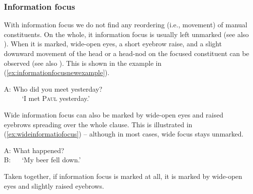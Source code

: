 \subsubsection{Information focus}
With information focus we do not find any reordering (i.e., movement) of manual constituents. On the whole, it information focus is usually left unmarked (see also \citealt{waleschkowski2009}). When it is marked, wide-open eyes, a short eyebrow raise, and a slight downward movement of the head or a head-nod on the focused constituent can be observed (see also \citealt[396]{happ2014vork}). This is shown in the example in (\ref{ex:informationfocusnewexample}).

\begin{exe}
\ex\label{ex:informationfocusnewexample}
A: Who did you meet yesterday?\\
\textcolor{white}{B: }  
\glt \textcolor{white}{B: }`I met \textsc{Paul} yesterday.'
\end{exe}

\noindent Wide information focus can also be marked by wide-open eyes and raised eyebrows spreading over the whole clause. This is illustrated in (\ref{ex:wideinformatiofocus}) -- although in most cases, wide focus stays unmarked. %

\begin{exe}
\ex
A: What happened? \\
B: 
%
\glt \textcolor{white}{B: }`My beer fell down.' \label{ex:wideinformatiofocus}

\end{exe}

\noindent Taken together, if information focus is marked at all, it is marked by wide-open eyes and slightly raised eyebrows.



